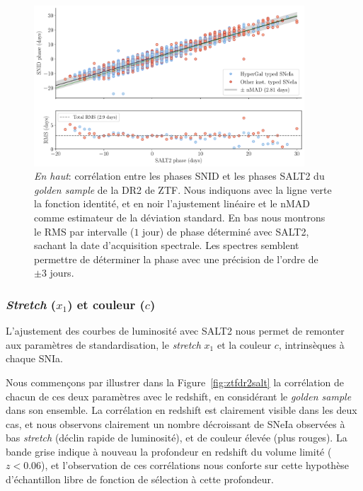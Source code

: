 \documentclass[../main/main.tex]{subfiles}
\begin{document}
\begin{figure}[ht]
  \centering
  \includegraphics[width=0.9\textwidth]{../figures/09_dr2/snidphase_vsphase_dr2.pdf}
  \caption[Corrélation phases SNID vs phases SALT2 de la DR2 de
  ZTF.]{\emph{En haut}: corrélation entre les phases SNID et les phases SALT2 du
    \textit{golden sample} de la DR2 de ZTF. Nous indiquons avec la
    ligne verte la fonction identité, et en noir l'ajustement linéaire
    et le nMAD comme estimateur de la déviation standard. En bas nous
    montrons le RMS par intervalle ($1$ jour) de phase déterminé avec
    SALT2, sachant la date d'acquisition spectrale. Les spectres
    semblent permettre de déterminer la phase avec une précision de
    l'ordre de $\pm3$ jours.}
  \label{fig:snid_vs_salt_phase}
\end{figure}


\subsubsection{\textit{Stretch} ($x_{1}$) et couleur ($c$)}

L'ajustement des courbes de luminosité avec SALT2 nous permet de
remonter aux paramètres de standardisation, le \textit{stretch} $x_{1}$
et la couleur $c$, intrinsèques à chaque SNIa.

Nous commençons par illustrer dans la Figure~\ref{fig:ztfdr2salt} la
corrélation de chacun de ces deux paramètres avec le redshift, en
considérant le \textit{golden sample} dans son ensemble. La corrélation
en redshift est clairement visible dans les deux cas, et nous observons
clairement un nombre décroissant de SNeIa observées à bas
\textit{stretch} (déclin rapide de luminosité), et de couleur élevée
(plus rouges). La bande grise indique à nouveau la profondeur en
redshift du volume limité ($z<0.06$), et l'observation de ces
corrélations nous conforte sur cette hypothèse d'échantillon libre de
fonction de sélection à cette profondeur.
\end{document}
